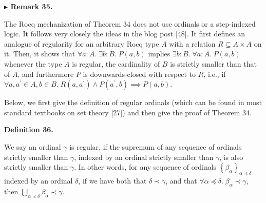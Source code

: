 \documentclass[10pt,a4paper]{article}
\begin{document}
 
 
 
\par\medskip\noindent\textbf{$\blacktriangleright$ Remark 35.}\par
 
 
The Rocq mechanization of Theorem 34 does not use ordinals or a step-indexed logic. It follows very closely the ideas in the blog post [48]. It first defines an analogue of regularity for an arbitrary Rocq type $A$ with a relation $R\subseteq A\times A$ on it. Then, it shows that $\forall a:A.\;\exists b:B.\;P(a,b)$ implies $\exists b:B.\;\forall a:A.\;P(a,b)$ whenever the type $A$ is regular, the cardinality of $B$ is strictly smaller than that of $A$, and furthermore $P$ is downwards-closed with respect to $R$, i.e., if $\forall a,a^{\prime}\in A,b\in B.\;R(a,a^{\prime})\land P(a^{\prime},b)\implies P(a,b)$.\par
 
 
 
 
Below, we first give the definition of regular ordinals (which can be found in most standard textbooks on set theory [27]) and then give the proof of Theorem 34.\par
 
 
 
\par\medskip\noindent\textbf{Definition 36.}\par
 
 
We say an ordinal $\gamma$ is regular, if the supremum of any sequence of ordinals strictly smaller than $\gamma$, indexed by an ordinal strictly smaller than $\gamma$, is also strictly smaller than $\gamma$. In other words, for any sequence of ordinals $\left\{\beta_{\alpha}\right\}_{\alpha\preceq\delta}$ indexed by an ordinal $\delta$, if we have both that $\delta\prec\gamma$, and that $\forall\alpha\preceq\delta.\;\beta_{\alpha}\prec\gamma$, then $\bigcup_{\alpha\preceq\delta}\beta_{\alpha}\prec\gamma$.\par
 
 
\end{document}
